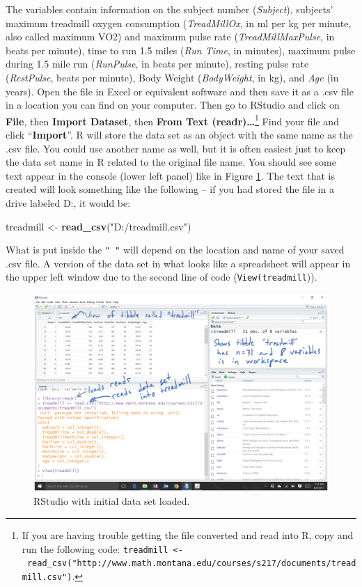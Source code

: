 \documentclass[]{book}
\newenvironment{Shaded}{\begin{snugshade}}{\end{snugshade}}
\newcommand{\KeywordTok}[1]{\textcolor[rgb]{0.13,0.29,0.53}{\textbf{#1}}}
\newcommand{\NormalTok}[1]{#1}
\newcommand{\StringTok}[1]{\textcolor[rgb]{0.31,0.60,0.02}{#1}}
\let\rmarkdownfootnote\footnote%
\def\footnote{\protect\rmarkdownfootnote}
\renewcommand{\indent}{\hspace{15pt}}
\renewenvironment{Shaded}{%
\setlength{\FrameRule}{1.5pt}
\def\FrameCommand{\fboxrule=\FrameRule\fboxsep=5pt 
                  \fcolorbox{framecolor}{shadecolor}}%
\MakeFramed {\FrameRestore}}%
{\endMakeFramed}
\begin{document}
\indent The variables contain information on the subject number (\emph{Subject}), subjects'
maximum treadmill oxygen consumption (\emph{TreadMillOx}, in ml per kg per minute, also called maximum VO2) and
maximum pulse rate (\emph{TreadMillMaxPulse}, in beats per minute), time to run 1.5
miles (\emph{Run Time}, in minutes), maximum pulse
during 1.5 mile run (\emph{RunPulse}, in beats per minute), resting pulse rate
(\emph{RestPulse}, beats per minute), Body Weight (\emph{BodyWeight}, in kg), and \emph{Age}
(in years). Open the file in Excel or equivalent software and then save it as
a .csv file in a location you can find on your computer. Then go to RStudio
and click on \textbf{File}, then \textbf{Import Dataset}, then \textbf{From Text (readr)\ldots{}}\footnote{If
  you are having trouble getting the file converted and read into R, copy and
  run the following code:
  \texttt{treadmill\ \textless{}-\ read\_csv("http://www.math.montana.edu/courses/s217/documents/treadmill.csv")}.}
Find your file and click ``\textbf{Import}''. R will store the data set as an object with the same name
as the .csv file. You could use another name as well, but it is
often easiest just to keep the data
set name in R related to the original file name. You should see some text appear
in the console (lower left panel) like in Figure \ref{fig:Figure1-3}. The text
that is created
will look something like the following -- if you had stored the file in a drive
labeled D:, it would be:

\begin{Shaded}
\begin{Highlighting}[]
\NormalTok{treadmill <-}\StringTok{ }\KeywordTok{read_csv}\NormalTok{(}\StringTok{"D:/treadmill.csv"}\NormalTok{)}
\end{Highlighting}
\end{Shaded}

What is put inside the
\texttt{"\ "} will depend on the location and name of your saved .csv file. A
version of the data set in what looks like a
spreadsheet will appear in the upper left window due to the second line of
code (\texttt{View(treadmill})).



\begin{figure}[ht]
\includegraphics[width=13.44in]{chapter1_files/fig1.3} \caption{RStudio with initial data set loaded.}\label{fig:Figure1-3}
\end{figure}
\end{document}
